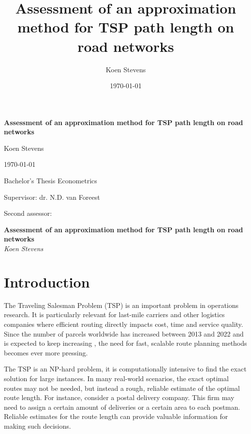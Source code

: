 \documentclass[12pt]{article}
\title{Assessment of an approximation method for TSP path length on road networks}
\author{Koen Stevens}
\date{\today}
\numberwithin{equation}{section}
\newcommand{\1}[1]{\,I_{#1}} %
\begin{document}
\begin{titlepage}
	\centering
	\vspace*{0.3\textheight}
	{\LARGE\bfseries Assessment of an approximation method for TSP path length on road networks \par}
	\vspace{2cm}
	{\Large Koen Stevens \par}
	\vfill
	{\large \today \par} %
\end{titlepage}
\clearpage
\thispagestyle{empty}
\vspace*{0.3\textheight}
{\Large Bachelor's Thesis Econometrics \par}
\vspace{1cm}
{\large Supervisor: dr. N.D. van Foreest \par}
\vspace{0.5cm}
{\large Second assessor:  \par}
\clearpage
{}
\pagestyle{plain}
\begin{center}
	\LARGE \textbf{Assessment of an approximation method for TSP path length on road networks} \\[1.5ex]
	\large \textit{Koen Stevens}
\end{center}
\begin{abstract}

\end{abstract}
\section{Introduction}
The Traveling Salesman Problem (TSP) is an important problem in operations research.
It is particularly relevant for last-mile carriers and other logistics companies where efficient
routing directly impacts cost, time and service quality. Since the number of parcels worldwide has
increased between 2013 and 2022 and is expected to keep increasing \cite{statista}, the need for
fast, scalable route planning methods becomes ever more pressing.

The TSP is an NP-hard problem, it is computationally intensive to find the exact solution for
large instances. In many real-world scenarios, the exact optimal routes may not be needed, but
instead a rough, reliable estimate of the optimal route length. For instance, consider a postal delivery company.
This firm may need to assign a certain amount of deliveries or a certain area to each postman.
Reliable estimates for the route length can provide valuable information for making such decisions.
\end{document}
